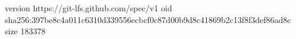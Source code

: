 version https://git-lfs.github.com/spec/v1
oid sha256:397be8c4a011c6310d339556ecbcf0c87d00b9d8c41869b2c13f8f3def86ad8c
size 183378
